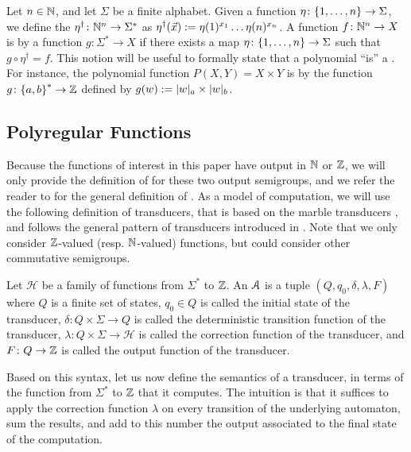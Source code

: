 \AP Let $n \in \mathbb{N}$, and let $\Sigma$ be a finite alphabet. Given a function
$\eta \colon \mathopen{\{} 1, \dots, n \mathclose{\}} \to \Sigma$, we define the $\eta^\dagger \colon
\mathbb{N}^n \to \Sigma^*$ as $\eta^\dagger(\vec{x}) \mathrel{:=} \eta(1)^{x_1} \dots
\eta(n)^{x_n}$. A function $f \colon \mathbb{N}^n \to X$ is  by a
 function $g \colon \Sigma^* \to X$ if there exists a map $\eta
\colon \mathopen{\{} 1, \dots, n \mathclose{\}} \to \Sigma$ such that $g \circ \eta^\dagger = f$. This
notion will be useful to formally state that a polynomial ``is'' a
 . For instance, the polynomial
function $P(X,Y) = X \times Y$ is  by the 
function $g \colon \mathopen{\{} a,b \mathclose{\}}^* \to \mathbb{Z}$ defined by $g(w) \defined \card[a]{w}
\times \card[b]{w}$.

\subsection{Polyregular Functions}

\AP Because the functions of interest in this paper have output in $\mathbb{N}$ or
$\mathbb{Z}$, we will only provide the definition of  for
these two output semigroups, and we refer the reader to \cite{BOKL19} for the
general definition of . As a model of computation, we
will use the following definition of transducers, that is based on the marble
transducers \cite{EHB99}, and follows the general pattern of transducers
introduced in \cite{CDTL23}. Note that we only consider $\mathbb{Z}$-valued (resp.
$\mathbb{N}$-valued) functions, but could consider other commutative semigroups.

\begin{definition}
    Let $\mathcal{H}$ be a family of functions
    from $\Sigma^*$ to $\mathbb{Z}$.
    An  $\mathcal{A}$ is
    a tuple $(Q, q_0, \delta, \lambda, F)$ where
         $Q$ is a finite set of states,
         $q_0 \in Q$ is called the initial state of the transducer,
         $\delta \colon Q \times \Sigma \to Q$
            is called the deterministic transition function of the transducer,
         $\lambda \colon Q \times \Sigma \to \mathcal{H}$
            is called the correction function of the transducer,
         and $F \colon Q \to \mathbb{Z}$ is called the output function of the transducer.
\end{definition}

Based on this syntax, let us now define the semantics of a transducer, in terms
of the function from $\Sigma^*$ to $\mathbb{Z}$ that it computes. The intuition is
that it suffices to apply the correction function $\lambda$ on every transition
of the underlying automaton, sum the results, and add to this number the output
associated to the final state of the computation.

